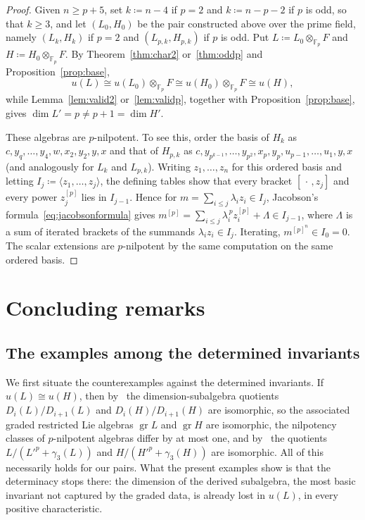\documentclass[11pt,reqno]{amsart}
\theoremstyle{plain}
\theoremstyle{remark}
\newcommand{\Fp}{\mathbb{F}_p}
\newcommand{\gr}{\operatorname{gr}}
\newcommand{\spann}[1]{\langle #1\rangle}
\begin{document}
\begin{proof}
Given $n\ge p+5$, set $k\coloneqq n-4$ if $p=2$ and $k\coloneqq n-p-2$ if $p$ is odd, so that
$k\ge3$, and let $(L_0,H_0)$ be the pair constructed above over the prime field,
namely $(L_k,H_k)$ if $p=2$ and $(L_{p,k},H_{p,k})$ if $p$ is odd. Put
$L\coloneqq L_0\otimes_{\Fp}F$ and $H\coloneqq H_0\otimes_{\Fp}F$. By
Theorem~\ref{thm:char2} or~\ref{thm:oddp} and Proposition~\ref{prop:base},
\[
u(L)\cong u(L_0)\otimes_{\Fp}F\cong u(H_0)\otimes_{\Fp}F\cong u(H),
\]
while Lemma~\ref{lem:valid2} or~\ref{lem:validp},
together with Proposition~\ref{prop:base}, gives $\dim L'=p\neq p+1=\dim H'$.

These algebras are $p$-nilpotent. To see this, order the basis of $H_k$ as
$c,y_q,\dots,y_4,w,x_2,y_2,y,x$ and that of $H_{p,k}$ as
$c,y_{p^{k-1}},\dots,y_{p^2},x_p,y_p,u_{p-1},\dots,u_1,y,x$ (and analogously
for $L_k$ and $L_{p,k}$). Writing $z_1,\dots,z_n$ for this ordered basis and letting
$I_j\coloneqq \spann{z_1,\dots,z_j}$, the defining tables show that every bracket
$[\,\cdot\,,z_j]$ and every power $z_j^{[p]}$ lies in $I_{j-1}$. Hence for
$m=\sum_{i\le j}\lambda_iz_i\in I_j$, Jacobson's
formula~\eqref{eq:jacobsonformula} gives
$m^{[p]}=\sum_{i\le j}\lambda_i^{\,p}z_i^{[p]}+\Lambda\in I_{j-1}$, where
$\Lambda$ is a sum of iterated brackets of the summands $\lambda_iz_i\in I_j$.
Iterating, $m^{[p]^n}\in I_0=0$. The scalar extensions are $p$-nilpotent by
the same computation on the same ordered basis.
\end{proof}

\section{Concluding remarks}\label{sec:concl}

\subsection*{The examples among the determined invariants}

We first situate the counterexamples against the determined invariants.
If $u(L)\cong u(H)$, then by~\cite{UsefiPAMS,UsefiSurvey} the
dimension-subalgebra quotients $D_i(L)/D_{i+1}(L)$ and $D_i(H)/D_{i+1}(H)$
are isomorphic, so the associated graded restricted Lie algebras $\gr L$
and $\gr H$ are isomorphic, the nilpotency classes of $p$-nilpotent
algebras differ by at most one, and by~\cite{UsefiPacific} the quotients
$L/({L'}^{p}+\gamma_3(L))$ and $H/({H'}^{p}+\gamma_3(H))$ are isomorphic. All
of this necessarily holds for our pairs. What the present examples show is
that the determinacy stops there: the dimension of the derived subalgebra,
the most basic invariant not captured by the graded data, is already lost in
$u(L)$, in every positive characteristic.
\end{document}
